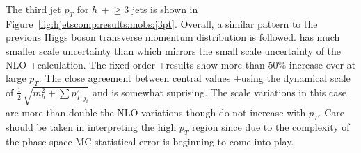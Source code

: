 The third jet $p_T$ for $h\,+\!\ge\!\!3$ jets is shown in
Figure~\ref{fig:hjetscomp:results:mobs:j3pt}. Overall, a similar pattern to the
previous Higgs boson transverse momentum distribution is followed. \Sherpa
\MEPSatNLO has much smaller scale uncertainty than \MGaMC which mirrors 
the small scale uncertainty of the NLO \GoSam{}+\Sherpa calculation. The fixed
order \GoSam{}+\Sherpa results show more than 50\% increase over \Powheg at large
$p_T$.  The close agreement between central values \GoSam{}+\Sherpa using the
dynamical scale of $\tfrac{1}{2}\,\sqrt{m_{h}^2+\sum p_{T,j_i}^2}$ and \Minlo
is somewhat suprising. The \Minlo scale variations in this case are more than
double the NLO variations though do not increase with $p_T$. Care
should be taken in interpreting the high $p_T$ region since due to the
complexity of the phase space MC statistical error is beginning to come into
play.


